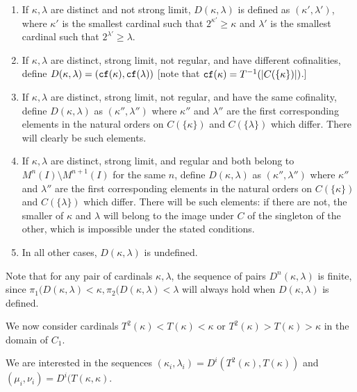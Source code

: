 \documentclass[12pt]{article}
\begin{document}
\begin{enumerate}

\item  If $\kappa,\lambda$ are distinct and not strong limit, $D(\kappa,\lambda)$ is defined as $(\kappa',\lambda')$, where $\kappa'$ is the smallest cardinal such that $2^{\kappa'}\geq \kappa$ and $\lambda'$ is the smallest cardinal such that $2^{\lambda'}\geq \lambda$.

\item  If $\kappa,\lambda$ are distinct, strong limit, not regular, and have different cofinalities, define $D(\kappa,\lambda)=({\tt cf}(\kappa),{\tt cf}(\lambda))$ [note that ${\tt cf}(\kappa) = T^{-1}(|C(\{\kappa\})|)$.]

\item If $\kappa,\lambda$ are distinct, strong limit, not regular, and have the same cofinality, define $D(\kappa,\lambda)$ as $(\kappa'',\lambda'')$ where $\kappa''$ and $\lambda''$ are the first corresponding elements in the natural
orders on $C(\{\kappa\})$ and $C(\{\lambda\})$ which differ.  There will clearly be such elements.

\item If $\kappa,\lambda$ are distinct, strong limit, and regular and both belong to $M^n(I)\setminus M^{n+1}(I)$ for the same $n$, define $D(\kappa,\lambda)$ as $(\kappa'',\lambda'')$ where $\kappa''$ and $\lambda''$ are the first corresponding elements in the natural
orders on $C(\{\kappa\})$ and $C(\{\lambda\})$ which differ.  There will be such elements:  if there are not, the smaller of $\kappa$ and $\lambda$ will belong to the image under $C$ of the singleton of the other, which is impossible under the stated conditions.

\item  In all other cases, $D(\kappa,\lambda)$ is undefined.

\end{enumerate}

Note that for any pair of cardinals $\kappa,\lambda$, the sequence of pairs $D^n(\kappa,\lambda)$ is finite, since $\pi_1(D(\kappa,\lambda)<\kappa, \pi_2(D(\kappa,\lambda)<\lambda$ will always hold when $D(\kappa,\lambda)$ is defined.

We now consider cardinals $T^2(\kappa) < T(\kappa) < \kappa$ or $T^2(\kappa) > T(\kappa) > \kappa$ in the domain of $C_1$.

We are interested in the sequences $(\kappa_i,\lambda_i) = D^i(T^2(\kappa),T(\kappa))$ and $(\mu_i,\nu_i) = D^i(T(\kappa,\kappa)$.
\end{document}
